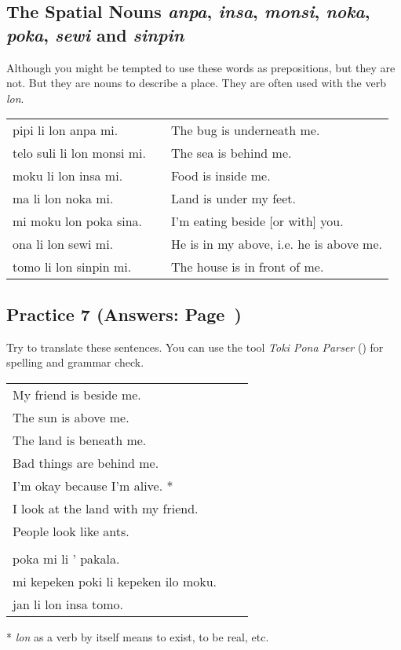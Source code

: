 \subsection*{The Spatial Nouns \textit{anpa}, \textit{insa}, \textit{monsi}, \textit{noka}, \textit{poka}, \textit{sewi} and \textit{sinpin}}
%
Although you might be tempted to use these words as prepositions, but they are not. 
But they are nouns to describe a place.
They are often used with the verb \textit{lon}. 

\begin{supertabular}{p{5,5cm}|ll}
pipi li lon anpa mi.       && The bug is underneath me. \\
telo suli li lon monsi mi. && The sea is behind me.  \\
moku li lon insa mi.       && Food is inside me. \\
ma li lon noka mi.         && Land is under my feet. \\
mi moku lon poka sina.     && I'm eating beside [or with] you. \\
ona li lon sewi mi.        && He is in my above, i.e. he is above me. \\
tomo li lon sinpin mi.     && The house is in front of me. \\
\end{supertabular} 
%
%
\newpage
\subsection*{Practice 7 (Answers: Page~\pageref{'other_prepositions'})}
%
Try to translate these sentences. 
You can use the tool \textit{Toki Pona Parser} (\cite{www:rowa:02}) for spelling and grammar check. 

\begin{supertabular}{p{5,5cm}|ll}
My friend is beside me. && \\ %
The sun is above me. && \\ %
The land is beneath me. && \\ %
Bad things are behind me. && \\ %
I'm okay because I'm alive. * && \\ %
I look at the land with my friend. && \\ %
People look like ants. && \\ %
 && \\ %
poka mi li ' pakala. && \\ %
mi kepeken poki li kepeken ilo moku. && \\ %
jan li lon insa tomo. && \\ %
\end{supertabular} 

* \textit{lon} as a verb by itself means to exist, to be real, etc. 
% 
